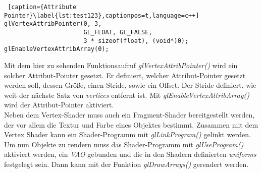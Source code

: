 \documentclass[11pt,a4paper]{article}
\begin{document}
\begin{lstlisting} [caption={Attribute Pointer}\label{lst:test123},captionpos=t,language=c++]
glVertexAttribPointer(0, 3,
                      GL_FLOAT, GL_FALSE,
                      3 * sizeof(float), (void*)0);
glEnableVertexAttribArray(0);
\end{lstlisting}
\noindent
Mit dem hier zu sehenden Funktionsaufruf \mbox{\textit{glVertexAttribPointer()}} wird ein solcher Attribut-Pointer gesetzt. Er definiert, welcher Attribut-Pointer gesetzt werden soll, dessen Größe, einen Stride, sowie ein Offset. Der Stride definiert, wie weit der nächste Satz von \mbox{\textit{vertices}} entfernt ist. Mit \mbox{\textit{glEnableVertexAttribArray()}} wird der Attribut-Pointer aktiviert.\\
Neben dem Vertex-Shader muss auch ein Fragment-Shader bereitgestellt werden, der vor allem die Textur und Farbe eines Objektes bestimmt. Zusammen mit dem Vertex Shader kann ein Shader-Programm mit \mbox{\textit{glLinkProgram()}} gelinkt werden.\\
Um nun Objekte zu rendern muss das Shader-Programm mit \mbox{\textit{glUseProgram()}} aktiviert werden, ein \mbox{\textit{VAO}} gebunden und die in den Shadern definierten \mbox{\textit{uniforms}} festgelegt sein. Dann kann mit der Funktion \mbox{\textit{glDrawArrays()}} gerendert werden.
\end{document}
